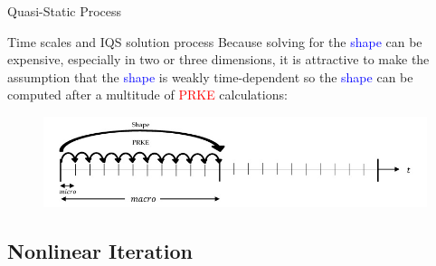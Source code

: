 \documentclass[8pt,xcolor=dvipnames]{beamer}
\newcommand{\tcr}[1]{\textcolor{red}{#1}}
\newcommand{\tcb}[1]{\textcolor{blue}{#1}}
\begin{document}
\begin{frame}{Quasi-Static Process}

\begin{block}{Time scales and IQS solution process}
Because solving for the \tcb{shape} can be expensive, especially in two or three dimensions, it is attractive to make the assumption that the \tcb{shape} is weakly time-dependent so the \tcb{shape} can be computed after a multitude of \tcr{PRKE} calculations:
\begin{figure}
\includegraphics[width=\linewidth]{figures/IQS_visualization.jpg}
\end{figure}
\end{block}

\end{frame}

\subsection{Nonlinear Iteration}
\end{document}
